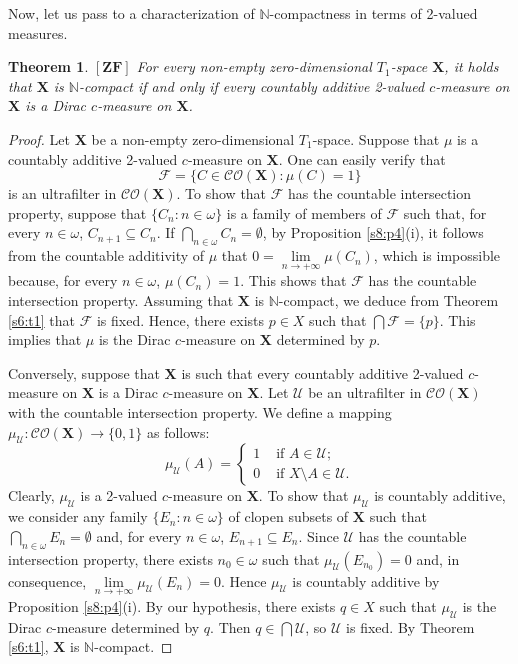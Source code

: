 \documentclass[12pt,twoside,leqno]{article}
\theoremstyle{plain}
\newtheorem{theorem}{Theorem}[section]
\theoremstyle{definition}
\theoremstyle{remark}
\begin{document}
Now, let us pass to a characterization of $\mathbb{N}$-compactness in terms of 2-valued measures.

\begin{theorem}
	\label{s8:t12}
	$[\mathbf{ZF}]$ For every non-empty zero-dimensional $T_1$-space $\mathbf{X}$, it holds that $\mathbf{X}$ is $\mathbb{N}$-compact if and only if every countably additive 2-valued  $c$-measure  on $\mathbf{X}$ is a Dirac $c$-measure on $\mathbf{X}$.
\end{theorem}
\begin{proof}
	Let $\mathbf{X}$ be a non-empty zero-dimensional $T_1$-space. Suppose that $\mu$ is a countably additive 2-valued $c$-measure on $\mathbf{X}$. One can easily verify that
	$$\mathcal{F}=\{ C\in\mathcal{CO}(\mathbf{X}): \mu(C)=1\}$$
	is an ultrafilter in $\mathcal{CO}(\mathbf{X})$. 
	To show that $\mathcal{F}$ has the countable intersection property, suppose that $\{C_n: n\in\omega\}$ is a family of members of $\mathcal{F}$ such that, for every $n\in\omega$, $C_{n+1}\subseteq C_n$. If $\bigcap\limits_{n\in\omega}C_n=\emptyset$, by Proposition \ref{s8:p4}(i), it follows from the countable additivity of $\mu$ that $0=\lim\limits_{n\to+\infty}\mu(C_n)$, which is impossible because, for every $n\in\omega$, $\mu(C_n)=1$. This shows that $\mathcal{F}$ has the countable intersection property. Assuming that $\mathbf{X}$ is $\mathbb{N}$-compact, we deduce from Theorem \ref{s6:t1} that $\mathcal{F}$ is fixed. Hence, there exists $p\in X$ such that $\bigcap\mathcal{F}=\{p\}$. This implies that $\mu$ is the Dirac $c$-measure on $\mathbf{X}$ determined by $p$.
	
	Conversely, suppose that $\mathbf{X}$ is such that every countably additive 2-valued $c$-measure on $\mathbf{X}$ is a Dirac $c$-measure on $\mathbf{X}$.  Let $\mathcal{U}$ be an ultrafilter in $\mathcal{CO}(\mathbf{X})$ with the countable intersection property. We define a mapping $\mu_{\mathcal{U}}:\mathcal{CO}(\mathbf{X})\to\{0, 1\}$ as follows:
	$$
	\mu_{\mathcal{U}}(A)=\begin{cases} 1 &\text{ if $A\in\mathcal{U}$;}\\
		0 &\text{ if $X\setminus A\in\mathcal{U}$.}\end{cases}
	$$
	Clearly, $\mu_{\mathcal{U}}$ is a 2-valued $c$-measure on $\mathbf{X}$. To show that $\mu_{\mathcal{U}}$ is countably additive, we consider any family $\{E_n: n\in\omega\}$ of clopen subsets of $\mathbf{X}$ such that $\bigcap\limits_{n\in\omega}E_n=\emptyset$ and, for every $n\in\omega$, $E_{n+1}\subseteq E_n$. Since $\mathcal{U}$ has the countable intersection property, there exists $n_0\in\omega$ such that $\mu_{\mathcal{U}}(E_{n_0})=0$ and, in consequence, $\lim\limits_{n\to+\infty}\mu_{\mathcal{U}}(E_n)=0$. Hence $\mu_{\mathcal{U}}$ is countably additive by Proposition \ref{s8:p4}(i). By our hypothesis, there exists $q\in X$ such that $\mu_{\mathcal{U}}$ is the Dirac $c$-measure determined by $q$. Then $q\in\bigcap\mathcal{U}$, so $\mathcal{U}$ is fixed. By Theorem \ref{s6:t1}, $\mathbf{X}$ is $\mathbb{N}$-compact.
\end{proof}
\end{document}
